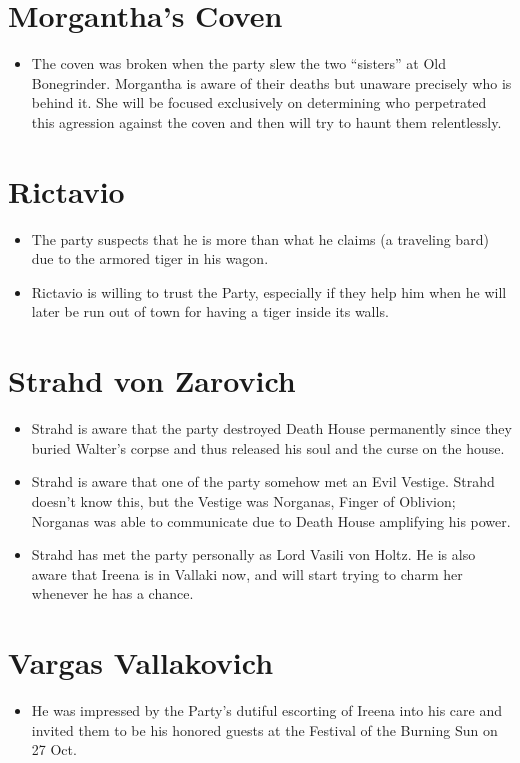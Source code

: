 \documentclass[a4paper,11pt]{article}
\begin{document}
\section{Morgantha's Coven}
\begin{itemize}
  \item The coven was broken when the party slew the two ``sisters'' at Old Bonegrinder. Morgantha is aware of 
  their deaths but unaware precisely who is behind it. She will be focused exclusively on determining who 
  perpetrated this agression against the coven and then will try to haunt them relentlessly.
\end{itemize}

\section{Rictavio}
\begin{itemize}
  \item The party suspects that he is more than what he claims (a traveling bard) due to the armored tiger in his 
  wagon.
  \item Rictavio is willing to trust the Party, especially if they help him when he will later be run out of town
  for having a tiger inside its walls.
\end{itemize}

\section{Strahd von Zarovich}
\begin{itemize}
  \item Strahd is aware that the party destroyed Death House permanently since they buried Walter's corpse and 
  thus released his soul and the curse on the house.
  \item Strahd is aware that one of the party somehow met an Evil Vestige. Strahd doesn't know this, but the 
  Vestige was Norganas, Finger of Oblivion; Norganas was able to communicate due to Death House amplifying his 
  power.
  \item Strahd has met the party personally as Lord Vasili von Holtz. He is also aware that Ireena is in Vallaki 
  now, and will start trying to charm her whenever he has a chance.
\end{itemize}

\section{Vargas Vallakovich}
\begin{itemize}
  \item He was impressed by the Party's dutiful escorting of Ireena into his care and invited them to be his
  honored guests at the Festival of the Burning Sun on 27 Oct.
\end{itemize}
\end{document}
